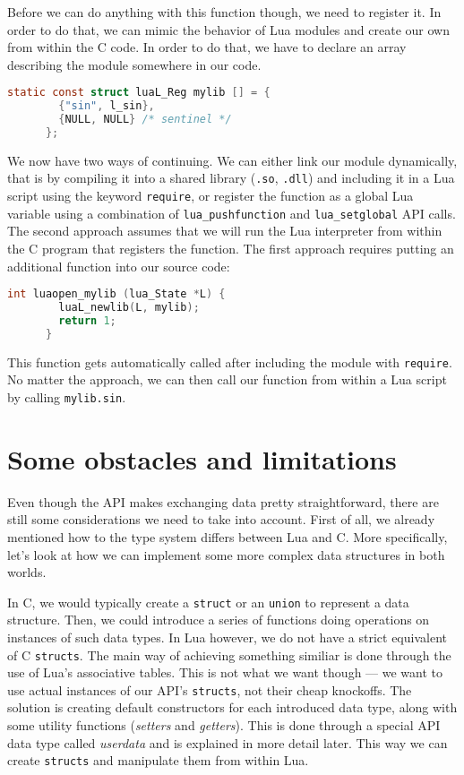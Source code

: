 \documentclass[polish, english]{iithesis}
\begin{document}
    Before we can do anything with this function though, we need to register it.
    In order to do that, we can mimic the behavior of Lua modules and create our own from within the C code.
    In order to do that, we have to declare an array describing the module somewhere in our code.
    \begin{lstlisting}[language=C, caption=Module declaration]
      static const struct luaL_Reg mylib [] = {
        {"sin", l_sin},
        {NULL, NULL} /* sentinel */
      };
    \end{lstlisting}
    We now have two ways of continuing.
    We can either link our module dynamically, that is by compiling it into a shared library (\texttt{.so}, \texttt{.dll}) and including it in a Lua script using the keyword \texttt{require}, or register the function as a global Lua variable using a combination of \texttt{lua\_pushfunction} and \texttt{lua\_setglobal} API calls. 
    The second approach assumes that we will run the Lua interpreter from within the C program that registers the function.
    The first approach requires putting an additional function into our source code:
    \begin{lstlisting}[language=C, caption=The \texttt{luaopen\_mylib} function]
      int luaopen_mylib (lua_State *L) {
        luaL_newlib(L, mylib);
        return 1;
      }
    \end{lstlisting}
    This function gets automatically called after including the module with \texttt{require}.
    No matter the approach, we can then call our function from within a Lua script by calling \texttt{mylib.sin}.
  \section{Some obstacles and limitations}
    Even though the API makes exchanging data pretty straightforward, there are still some considerations we need to take into account.
    First of all, we already mentioned how to the type system differs between Lua and C.
    More specifically, let's look at how we can implement some more complex data structures in both worlds.

    In C, we would typically create a \texttt{struct} or an \texttt{union} to represent a data structure.
    Then, we could introduce a series of functions doing operations on instances of such data types.
    In Lua however, we do not have a strict equivalent of C \texttt{structs}.
    The main way of achieving something similiar is done through the use of Lua's associative tables.
    This is not what we want though --- we want to use actual instances of our API's \texttt{structs}, not their cheap knockoffs.
    The solution is creating default constructors for each introduced data type, along with some utility functions (\textit{setters} and \textit{getters}).
    This is done through a special API data type called \textit{userdata} and is explained in more detail later.
    This way we can create \texttt{structs} and manipulate them from within Lua.
\end{document}
